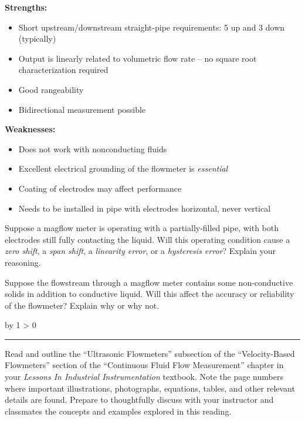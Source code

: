 \documentclass[12pt,a4paper]{article}
\def\oppgave{
            \advance\questnum by 1
            \ifnum \questnum > 0
                 \hrule
                 \vskip 3pt
                 \leftline{Oppgave \the\questnum}
                 \vskip 3pt \fi}
\begin{document}
\vskip 10pt

{\bf Strengths:}

\begin{itemize}
\item{} Short upstream/downstream straight-pipe requirements: 5 up and 3 down (typically)
\item{} Output is linearly related to volumetric flow rate -- no square root characterization required
\item{} Good rangeability
\item{} Bidirectional measurement possible
\end{itemize}

\vskip 10pt

{\bf Weaknesses:}

\begin{itemize}
\item{} Does not work with nonconducting fluids
\item{} Excellent electrical grounding of the flowmeter is {\it essential}
\item{} Coating of electrodes may affect performance
\item{} Needs to be installed in pipe with electrodes horizontal, never vertical
\end{itemize}

\vskip 10pt

Suppose a magflow meter is operating with a partially-filled pipe, with both electrodes still fully contacting the liquid.  Will this operating condition cause a {\it zero shift}, a {\it span shift}, a {\it linearity error}, or a {\it hysteresis error}?  Explain your reasoning.

\vskip 10pt

Suppose the flowstream through a magflow meter contains some non-conductive solids in addition to conductive liquid.  Will this affect the accuracy or reliability of the flowmeter?  Explain why or why not.

\vskip 10pt

\vskip 10pt \filbreak 
\oppgave{} 

Read and outline the ``Ultrasonic Flowmeters'' subsection of the ``Velocity-Based Flowmeters'' section of the ``Continuous Fluid Flow Measurement'' chapter in your {\it Lessons In Industrial Instrumentation} textbook.  Note the page numbers where important illustrations, photographs, equations, tables, and other relevant details are found.  Prepare to thoughtfully discuss with your instructor and classmates the concepts and examples explored in this reading.
\end{document}
